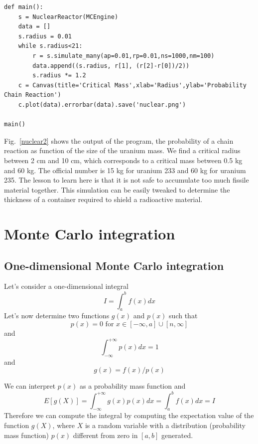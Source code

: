 \documentclass[justified,sixbynine]{tufte-book}
\def\ft{\small\tt}
\theoremstyle{plain}%
\theoremstyle{definition}
\theoremstyle{remark}
\begin{document}
\begin{fullwidth}
\begin{lstlisting}[caption={in file: {\ft nuclear.py}}]
def main():
    s = NuclearReactor(MCEngine)
    data = []
    s.radius = 0.01
    while s.radius<21:
        r = s.simulate_many(ap=0.01,rp=0.01,ns=1000,nm=100)
        data.append((s.radius, r[1], (r[2]-r[0])/2))
        s.radius *= 1.2
    c = Canvas(title='Critical Mass',xlab='Radius',ylab='Probability Chain Reaction')
    c.plot(data).errorbar(data).save('nuclear.png')

main()
\end{lstlisting}

Fig.~\ref{nuclear2} shows the output of the program, the probability of a chain reaction as function of the size of the uranium mass. We find a critical radius between 2 cm and 10 cm, which corresponds to a critical mass between 0.5 kg and 60 kg. The official number is 15 kg for uranium 233 and  60 kg for uranium 235. The lesson to learn here is that it is not safe to accumulate too much fissile material together. This simulation can be easily tweaked to determine the thickness of a container required to shield a radioactive material.

\section{Monte Carlo integration}

\goodbreak\subsection{One-dimensional Monte Carlo integration}

Let's consider a one-dimensional integral
\begin{equation}
I=\int_a^bf(x)dx
\end{equation}
Let's now determine two functions $g(x)$ and $p(x)$ such that
\begin{equation}
p(x)=0\text{ for }x\in [-\infty ,a]\cup [n,\infty ]
\end{equation}
and
\begin{equation}
\int_{-\infty }^{+\infty }p(x)dx=1
\end{equation}
and
\begin{equation}
g(x)=f(x)/p(x)
\end{equation}

We can interpret $p(x)$ as a probability mass function and
\begin{equation}
E[g(X)]=\int_{-\infty }^{+\infty }g(x)p(x)dx=\int_a^bf(x)dx=I
\end{equation}
Therefore we can compute the integral by computing the expectation value of
the function $g(X)$, where $X$ is a random variable with a distribution
(probability mass function) $p(x)$ different from zero in $[a,b]$ generated.


\end{fullwidth}
\end{document}
